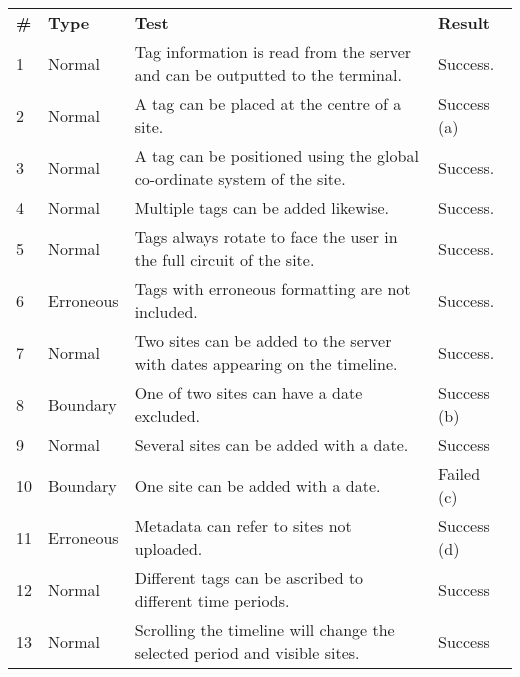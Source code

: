 \documentclass[12pt, a4paper]{article}
\begin{document}
\begin{table}[H]
\centering
\scriptsize
\begin{tabular}{llll}
\textbf{\#} & \textbf{Type} & \textbf{Test}                                                              & \textbf{Result}                       \\
1 & Normal   & Tag information is read from the server and can be outputted to the terminal. & Success.                                       \\
2 & Normal   & A tag can be placed at the centre of a site.                                  & Success (a) \\
3          & Normal        & A tag can be positioned using the global co-ordinate system of the site.   & Success.                              \\
4          & Normal        & Multiple tags can be added likewise.                                       & Success.                              \\
5          & Normal        & Tags always rotate to face the user in the full circuit of the site.       & Success.                              \\
6          & Erroneous     & Tags with erroneous formatting are not included.                           & Success.                              \\
7          & Normal        & Two sites can be added to the server with dates appearing on the timeline. & Success.                              \\
8 & Boundary & One of two sites can have a date excluded.                                    & Success (b)     \\
9          & Normal        & Several sites can be added with a date.                                    & Success                               \\
10         & Boundary      & One site can be added with a date.                                         & Failed (c)                               \\
11         & Erroneous     & Metadata can refer to sites not uploaded.                                  & Success (d) \\
12         & Normal        & Different tags can be ascribed to different time periods.                  & Success                               \\
13         & Normal        & Scrolling the timeline will change the selected period and visible sites.  & Success                               \\

\end{tabular}
\end{table}
\end{document}
